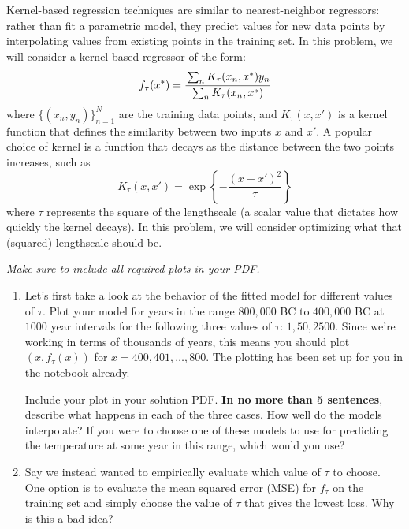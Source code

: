 \documentclass[submit]{harvardml}
\begin{document}
\begin{problem}
Kernel-based regression techniques are similar to nearest-neighbor
regressors: rather than fit a parametric model, they predict values
for new data points by interpolating values from existing points in
the training set.  In this problem, we will consider a kernel-based
regressor of the form:
\begin{equation*}
  f_\tau(x^*) = \cfrac{\sum_{n} K_\tau(x_n,x^*) y_n}{\sum_n K_\tau(x_n, x^*)} 
\end{equation*}
where $\{(x_n,y_n)\}_{n = 1} ^N$ are the training data points, and $K_\tau(x,x')$ is a
kernel function that defines the similarity between two inputs $x$ and
$x'$. A popular choice of kernel is a function that decays as the
distance between the two points increases, such as
\begin{equation*}
  K_\tau(x,x') = \exp\left\{-\frac{(x-x')^2}{\tau}\right\}
\end{equation*}
where $\tau$ represents the square of the lengthscale (a scalar value that 
dictates how quickly the kernel decays).  In this
problem, we will consider optimizing what that (squared) lengthscale
should be.

\noindent\emph{Make sure to include all required plots in your PDF.}

\begin{enumerate}
  
\item Let's first take a look at the behavior of the fitted model for different values of $\tau$. Plot your model for years in the range $800,000$ BC to $400,000$ BC at $1000$ year intervals for the following three values of $\tau$: $1, 50, 2500$. Since we're working in terms of thousands of years, this means you should plot $(x, f_\tau(x))$ for $x = 400, 401, \dots, 800$. The plotting has been set up for you in the notebook already.


Include your plot in your solution PDF.
\textbf{In no more than 5 sentences}, describe what happens in each of the three cases. How well do the models interpolate? If you were to choose one of these models to use for predicting the temperature at some year in this range, which would you use? 

\item Say we instead wanted to empirically evaluate which value of $\tau$ to choose. One option is to evaluate the mean squared error (MSE) for $f_{\tau}$ on the training set and simply choose the value of $\tau$ that gives the lowest loss. Why is this a bad idea?
    

\end{enumerate}
\end{problem}
\end{document}
